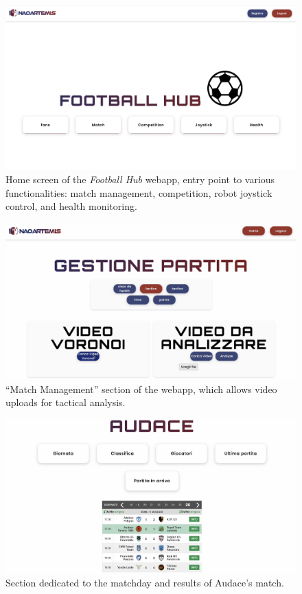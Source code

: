 \documentclass{optica-article}
\begin{document}
\begin{figure}[H]
    \centering
    \includegraphics[width=\textwidth]{figures/homescreen.png}
    \caption{Home screen of the \textit{Football Hub} webapp, entry point to various functionalities: match management, competition, robot joystick control, and health monitoring.}
    \label{fig:home-screen}
\end{figure}

\begin{figure}[H]
    \centering
    \includegraphics[width=\textwidth]{figures/gestione_partita.PNG}
    \caption{“Match Management” section of the webapp, which allows video uploads for tactical analysis.}
    \label{fig:gestione-partita}
\end{figure}

\begin{figure}[H]
  \centering
  \includegraphics[width=\textwidth]{figures/audace.jpg}
  \caption{Section dedicated to the matchday and results of Audace’s match.}
\end{figure}
\end{document}
